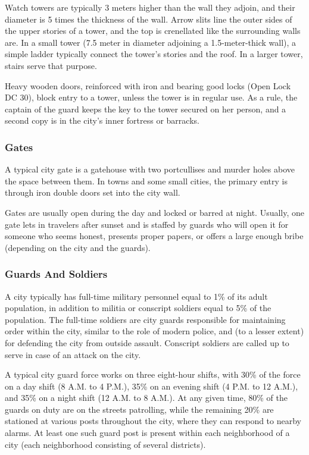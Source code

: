 Watch towers are typically 3 meters higher than the wall they adjoin, and their diameter is 5 times the thickness of the wall. Arrow slits line the outer sides of the upper stories of a tower, and the top is crenellated like the surrounding walls are. In a small tower (7.5 meter in diameter adjoining a 1.5-meter-thick wall), a simple ladder typically connect the tower's stories and the roof. In a larger tower, stairs serve that purpose.

Heavy wooden doors, reinforced with iron and bearing good locks (Open Lock DC 30), block entry to a tower, unless the tower is in regular use. As a rule, the captain of the guard keeps the key to the tower secured on her person, and a second copy is in the city's inner fortress or barracks.

\subsubsection{Gates}
A typical city gate is a gatehouse with two portcullises and murder holes above the space between them. In towns and some small cities, the primary entry is through iron double doors set into the city wall.

Gates are usually open during the day and locked or barred at night. Usually, one gate lets in travelers after sunset and is staffed by guards who will open it for someone who seems honest, presents proper papers, or offers a large enough bribe (depending on the city and the guards).

\subsubsection{Guards And Soldiers}
A city typically has full-time military personnel equal to 1\% of its adult population, in addition to militia or conscript soldiers equal to 5\% of the population. The full-time soldiers are city guards responsible for maintaining order within the city, similar to the role of modern police, and (to a lesser extent) for defending the city from outside assault. Conscript soldiers are called up to serve in case of an attack on the city.

A typical city guard force works on three eight-hour shifts, with 30\% of the force on a day shift (8 A.M. to 4 P.M.), 35\% on an evening shift (4 P.M. to 12 A.M.), and 35\% on a night shift (12 A.M. to 8 A.M.). At any given time, 80\% of the guards on duty are on the streets patrolling, while the remaining 20\% are stationed at various posts throughout the city, where they can respond to nearby alarms. At least one such guard post is present within each neighborhood of a city (each neighborhood consisting of several districts).

